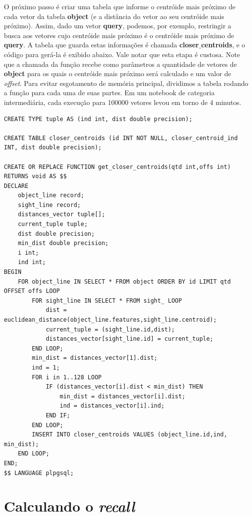 \documentclass[a4paper,12pt,titlepage]{scrartcl}
\begin{document}
O próximo passo é criar uma tabela que informe o centróide mais próximo de cada vetor da tabela \textbf{object} (e a distância do vetor ao seu centróide mais próximo). Assim, dado um vetor \textbf{query}, podemos, por exemplo, restringir a busca aos vetores cujo centróide mais próximo é o centróide mais próximo de \textbf{query}. A tabela que guarda estas informações é chamada \textbf{closer$\_$centroids}, e o código para gerá-la é exibido abaixo. Vale notar que esta etapa é custosa. Note que a chamada da função recebe como parâmetros a quantidade de vetores de \textbf{object} para os quais o centróide mais próximo será calculado e um valor de \emph{offset}. Para evitar esgotamento de memória principal, dividimos a tabela rodando a função para cada uma de suas partes. Em um notebook de categoria intermediária, cada execução para 100000 vetores levou em torno de 4 minutos. \\

\begin{minipage}\linewidth
\begin{lstlisting}[caption = Obtendo a tabela de centróides mais próximos, label = closcent]
CREATE TYPE tuple AS (ind int, dist double precision);

CREATE TABLE closer_centroids (id INT NOT NULL, closer_centroid_ind INT, dist double precision);

CREATE OR REPLACE FUNCTION get_closer_centroids(qtd int,offs int) RETURNS void AS $$
DECLARE
	object_line record;
	sight_line record;
	distances_vector tuple[];
	current_tuple tuple;
	dist double precision;
	min_dist double precision;
	i int;
	ind int;
BEGIN
	FOR object_line IN SELECT * FROM object ORDER BY id LIMIT qtd OFFSET offs LOOP
		FOR sight_line IN SELECT * FROM sight_ LOOP
			dist = euclidean_distance(object_line.features,sight_line.centroid);
			current_tuple = (sight_line.id,dist);
			distances_vector[sight_line.id] = current_tuple;
		END LOOP;
		min_dist = distances_vector[1].dist;
		ind = 1;
		FOR i in 1..128 LOOP
			IF (distances_vector[i].dist < min_dist) THEN
				min_dist = distances_vector[i].dist;
				ind = distances_vector[i].ind;
			END IF;
		END LOOP;
		INSERT INTO closer_centroids VALUES (object_line.id,ind, min_dist);
	END LOOP;
END;
$$ LANGUAGE plpgsql;

\end{lstlisting}
\end{minipage}
\vspace{5mm}

\section{Calculando o \textit{recall}}
\end{document}
